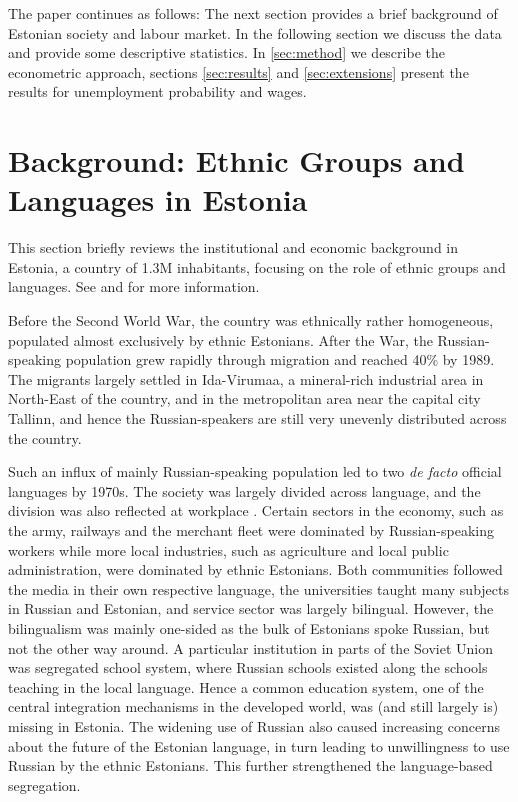 \documentclass[12pt, a4paper]{article}
\begin{document}
The paper continues as follows: The next section provides a brief
background of Estonian society and labour market. In the following
section we discuss the data and provide some descriptive
statistics. In \cref{sec:method} we describe the econometric
approach, sections \ref{sec:results} and \ref{sec:extensions} present
the results for unemployment probability and wages.


\section{Background: Ethnic Groups and Languages in Estonia}
\label{sec:hist_background}

This section briefly reviews the institutional and economic background
in Estonia, a country of 1.3M inhabitants,
focusing on the role of ethnic groups and languages.
See \citet{Leping2008} and
\citet{lindemann+saar2011Russian2ndGeneration} for more information.

Before the Second World War, the country was ethnically rather
homogeneous, populated almost exclusively by ethnic Estonians. After the War,
the Russian-speaking population grew rapidly through migration and
reached 40\% by 1989.  The migrants largely settled in Ida-Virumaa, a
mineral-rich industrial area in North-East of the country, and in the
metropolitan area near the capital city Tallinn, and hence the
Russian-speakers are still very unevenly distributed across the country.

Such an influx of mainly
Russian-speaking population
led to two \emph{de facto} official languages
by 1970s.
The society was largely divided across language, and the division was
also reflected at workplace \citep{leppik+vihalemm2015JofBaltStud}.
Certain sectors in the economy, such as the army, railways and the
merchant fleet
were dominated by
Russian-speaking workers while more local industries,
such as agriculture and
local public administration,
were dominated by ethnic Estonians.
Both communities followed the media in their own respective language, the
universities taught many subjects in Russian and Estonian,
and service sector was largely bilingual.  However, the bilingualism
was mainly one-sided as the bulk of Estonians spoke Russian, but not
the other way around.  A particular institution in parts of the Soviet
Union was segregated school system, where Russian schools existed along the
schools teaching in the local language.  Hence a common education
system, one of the central integration mechanisms in the developed world,
was (and still largely is) missing in Estonia.
The widening use of Russian also
caused increasing concerns about the future of the Estonian
language, in turn leading to  unwillingness to use Russian by
the ethnic Estonians.  This further strengthened the language-based segregation.
\end{document}
